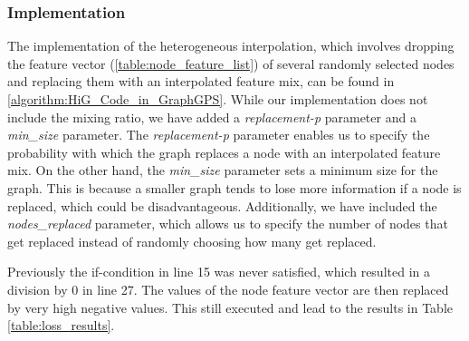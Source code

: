 \subsubsection{Implementation}
The implementation of the heterogeneous interpolation, which involves dropping the feature vector (\autoref{table:node_feature_list}) of several randomly selected nodes and replacing them with an interpolated feature mix, can be found in \autoref{algorithm:HiG_Code_in_GraphGPS}. While our implementation does not include the mixing ratio, we have added a \emph{replacement-p} parameter and a \emph{min\_size} parameter. The \emph{replacement-p} parameter enables us to specify the probability with which the graph replaces a node with an interpolated feature mix. On the other hand, the \emph{min\_size} parameter sets a minimum size for the graph. This is because a smaller graph tends to lose more information if a node is replaced, which could be disadvantageous. Additionally, we have included the \emph{nodes\_replaced} parameter, which allows us to specify the number of nodes that get replaced instead of randomly choosing how many get replaced.

Previously the if-condition in line 15 was never satisfied, which resulted in a division by 0 in line 27. The values of the node feature vector are then replaced by very high negative values. This still executed and lead to the results in Table \ref{table:loss_results}.

